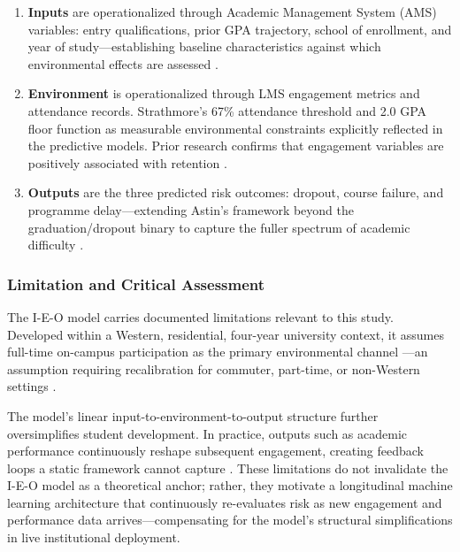 \documentclass[12pt]{report}
\begin{document}
\begin{enumerate}
    \item \textbf{Inputs} are operationalized through Academic Management System (AMS)
    variables: entry qualifications, prior GPA trajectory, school of enrollment,
    and year of study---establishing baseline characteristics against which
    environmental effects are assessed \parencite{astin2012}.

    \item \textbf{Environment} is operationalized through LMS engagement metrics and
    attendance records. Strathmore's 67\% attendance threshold and 2.0 GPA floor
    function as measurable environmental constraints explicitly reflected in the
    predictive models. Prior research confirms that engagement variables are
    positively associated with retention \parencite{Xiao2020}.

    \item \textbf{Outputs} are the three predicted risk outcomes: dropout, course
    failure, and programme delay---extending Astin's framework beyond the
    graduation/dropout binary to capture the fuller spectrum of academic
    difficulty \parencite{astin2012}.
\end{enumerate}

\subsubsection{Limitation and Critical Assessment}

The I-E-O model carries documented limitations relevant to this study.
Developed within a Western, residential, four-year university context, it
assumes full-time on-campus participation as the primary environmental channel
\parencite{astin1993}---an assumption requiring recalibration for commuter,
part-time, or non-Western settings \parencite{Karp2008}.

The model's linear input-to-environment-to-output structure further
oversimplifies student development. In practice, outputs such as academic
performance continuously reshape subsequent engagement, creating feedback
loops a static framework cannot capture \parencite{astin2012}. These
limitations do not invalidate the I-E-O model as a theoretical anchor; rather,
they motivate a longitudinal machine learning architecture that continuously
re-evaluates risk as new engagement and performance data arrives---compensating
for the model's structural simplifications in live institutional deployment.
\end{document}
